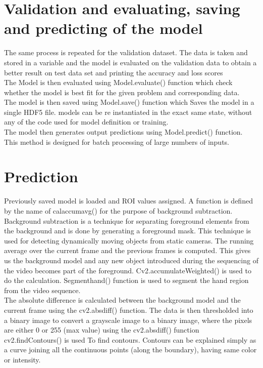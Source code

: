 \section{Validation and evaluating, saving and predicting of the model}
The same process is repeated for the validation dataset. The data is taken and stored in a variable and the model is evaluated on the validation data to obtain a better result on test data set and printing the accuracy and loss scores\\
The Model is then evaluated using Model.evaluate() function which check whether the model is best fit for the given problem and corresponding data. \\
The model is then saved using Model.save() function which Saves the model in a single HDF5 file. models can be re instantiated in the exact same state, without any of the code used for model definition or training.\\
The model then generates output predictions using Model.predict() function. This method is designed for batch processing of large numbers of inputs. 

\section{Prediction}
Previously saved model is loaded and ROI values assigned. A function is defined by the name of calaccumavg() for the purpose of background subtraction. Background subtraction is a technique for separating foreground elements from the background and is done by generating a foreground mask. This technique is used for detecting dynamically moving objects from static cameras. The running average over the current frame and the previous frames is computed. This gives us the background model and any new object introduced during the sequencing of the video becomes part of the foreground. Cv2.accumulateWeighted() is used to do the calculation. Segmenthand() function is used to segment the hand region from the video sequence. \\
The absolute difference is calculated between the background model and the current frame using the cv2.absdiff() function. The data is then thresholded into a binary image to convert a grayscale image to a binary image, where the pixels are either 0 or 255 (max value) using the cv2.absdiff() function cv2.findContours() is used To find contours. Contours can be explained simply as a curve joining all the continuous points (along the boundary), having same color or intensity. 

